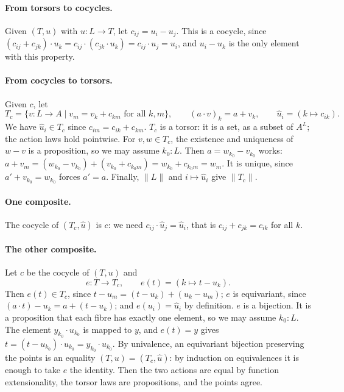 \documentclass[11pt]{article}
\newcommand{\tr}[1]{\lVert #1\rVert}
\theoremstyle{remark}
\begin{document}
\paragraph{From torsors to cocycles.} Given $(T,u)$ with $u:L\to T$, let
$c_{ij}=u_i-u_j$. This is a cocycle, since
$(c_{ij}+c_{jk})\cdot u_k=c_{ij}\cdot(c_{jk}\cdot u_k)=c_{ij}\cdot
u_j=u_i$, and $u_i-u_k$ is the only element with this property.

\paragraph{From cocycles to torsors.} Given $c$, let
\[
  T_c=\{v:L\to A\mid v_m=v_k+c_{km}\text{ for all }k,m\},\qquad
  (a\cdot v)_k=a+v_k,\qquad \hat u_i=(k\mapsto c_{ik}).
\]
We have $\hat u_i\in T_c$ since $c_{im}=c_{ik}+c_{km}$. $T_c$ is a torsor:
it is a set, as a subset of $A^L$; the action laws hold pointwise. For
$v,w\in T_c$, the existence and uniqueness of $w-v$ is a proposition,
so we may assume $k_0:L$. Then $a=w_{k_0}-v_{k_0}$ works:
$a+v_m=(w_{k_0}-v_{k_0})+(v_{k_0}+c_{k_0m})=w_{k_0}+c_{k_0m}=w_m$. It is
unique, since $a'+v_{k_0}=w_{k_0}$ forces $a'=a$. Finally, $\tr{L}$ and
$i\mapsto\hat u_i$ give $\tr{T_c}$.

\paragraph{One composite.} The cocycle of $(T_c,\hat u)$ is $c$: we need
$c_{ij}\cdot\hat u_j=\hat u_i$, that is $c_{ij}+c_{jk}=c_{ik}$ for all $k$.

\paragraph{The other composite.} Let $c$ be the cocycle of $(T,u)$ and
\[
  e:T\to T_c,\qquad e(t)=(k\mapsto t-u_k).
\]
Then $e(t)\in T_c$, since $t-u_m=(t-u_k)+(u_k-u_m)$; $e$ is
equivariant, since $(a\cdot t)-u_k=a+(t-u_k)$; and $e(u_i)=\hat u_i$ by
definition. $e$ is a bijection. It is a proposition that each fibre has
exactly one element, so we may assume $k_0:L$. The element
$y_{k_0}\cdot u_{k_0}$ is mapped to $y$, and $e(t)=y$ gives
$t=(t-u_{k_0})\cdot u_{k_0}=y_{k_0}\cdot u_{k_0}$. By univalence, an
equivariant bijection preserving the points is an equality
$(T,u)=(T_c,\hat u)$: by induction on equivalences it is enough to take
$e$ the identity. Then the two actions are equal by function
extensionality, the torsor laws are propositions, and the points agree.
\end{document}
